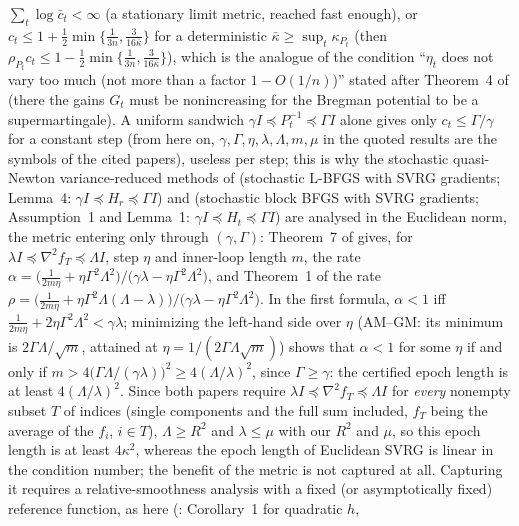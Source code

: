 $\sum_t\log\bar c_t<\infty$
(a stationary limit metric, reached fast enough), or
$c_t\le1+\frac12\min\{\frac1{3n},\frac3{16\bar\kappa}\}$ for a deterministic $\bar\kappa\ge\sup_t\kappa_{P_t}$
(then $\rho_{P_t}c_t\le1-\frac12\min\{\frac1{3n},\frac3{16\bar\kappa}\}$), which is the analogue of the
condition ``$\eta_t$ does
not vary too much (not more than a factor $1-O(1/n)$)'' stated after Theorem~4 of \cite{dragomir2021fast}
(there the gains $G_t$ must be nonincreasing for the Bregman potential to be a supermartingale). A uniform
sandwich $\gamma I\preceq P_t^{-1}\preceq\Gamma I$ alone gives only $c_t\le\Gamma/\gamma$ for a constant step
(from here on, $\gamma,\Gamma,\eta,\lambda,\Lambda,m,\mu$ in the quoted results are the symbols of the cited papers),
useless per step;
this is why the stochastic quasi-Newton variance-reduced methods of \cite{moritz2016linearly} (stochastic
L-BFGS with SVRG gradients; Lemma~4: $\gamma I\preceq H_r\preceq\Gamma I$) and \cite{gower2016stochastic}
(stochastic block BFGS with SVRG gradients; Assumption~1 and Lemma~1: $\gamma I\preceq H_t\preceq\Gamma I$)
are analysed in the Euclidean norm, the metric entering only through $(\gamma,\Gamma)$: Theorem~7 of
\cite{moritz2016linearly} gives, for $\lambda I\preceq\nabla^2f_T\preceq\Lambda I$, step $\eta$ and
inner-loop length $m$, the rate $\alpha=\big(\frac1{2m\eta}+\eta\Gamma^2\Lambda^2\big)\big/\big(\gamma\lambda-\eta\Gamma^2\Lambda^2\big)$,
and Theorem~1 of \cite{gower2016stochastic} the rate
$\rho=\big(\frac1{2m\eta}+\eta\Gamma^2\Lambda(\Lambda-\lambda)\big)\big/\big(\gamma\lambda-\eta\Gamma^2\Lambda^2\big)$.
In the first formula, $\alpha<1$ iff $\frac1{2m\eta}+2\eta\Gamma^2\Lambda^2<\gamma\lambda$; minimizing the
left-hand side over $\eta$ (AM--GM: its minimum is $2\Gamma\Lambda/\sqrt m$, attained at
$\eta=1/(2\Gamma\Lambda\sqrt m)$) shows that $\alpha<1$ for some $\eta$ if and only if
$m>4\big(\Gamma\Lambda/(\gamma\lambda)\big)^2\ge4(\Lambda/\lambda)^2$, since $\Gamma\ge\gamma$: the
certified epoch length is at least $4(\Lambda/\lambda)^2$. Since both papers require
$\lambda I\preceq\nabla^2f_T\preceq\Lambda I$ for \emph{every} nonempty subset $T$ of indices (single
components and the full sum included, $f_T$ being the average of the $f_i$, $i\in T$), $\Lambda\ge R^2$ and
$\lambda\le\mu$ with our $R^2$ and $\mu$, so this epoch length is at least $4\kappa^2$, whereas the epoch length
of Euclidean SVRG is linear in the condition number; the benefit of the metric is not captured at all.
Capturing it requires a relative-smoothness analysis with a fixed (or
asymptotically fixed) reference function, as here (\cite{dragomir2021fast}: Corollary~1 for quadratic $h$,

